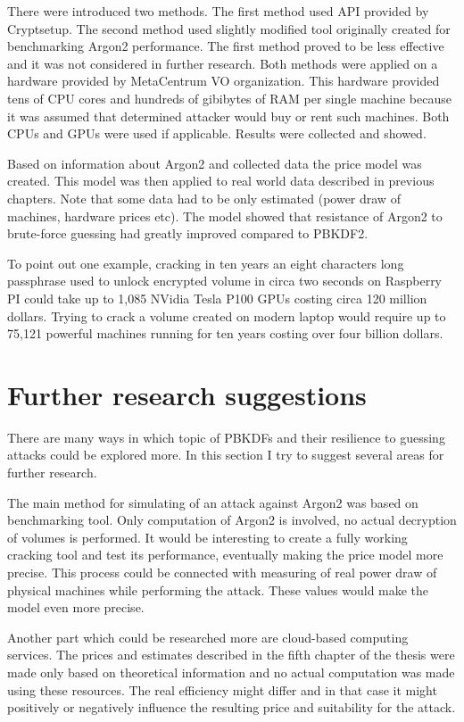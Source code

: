 \documentclass[nolof]{fithesis3}
\begin{document}
There were introduced two methods. The first method used API provided by Cryptsetup. The second method used slightly modified tool originally created for benchmarking Argon2 performance. The first method proved to be less effective and it was not considered in further research. Both methods were applied on a hardware provided by MetaCentrum VO organization. This hardware provided tens of CPU cores and hundreds of gibibytes of RAM per single machine because it was assumed that determined attacker would buy or rent such machines. Both CPUs and GPUs were used if applicable. Results were collected and showed.

Based on information about Argon2 and collected data the price model was created. This model was then applied to real world data described in previous chapters. Note that some data had to be only estimated (power draw of machines, hardware prices etc). The model showed that resistance of Argon2 to brute-force guessing had greatly improved compared to PBKDF2.

To point out one example, cracking in ten years an eight characters long passphrase used to unlock encrypted volume in circa two seconds on Raspberry PI could take up to 1,085 NVidia Tesla P100 GPUs costing circa 120 million dollars. Trying to crack a volume created on modern laptop would require up to 75,121 powerful machines running for ten years costing over four billion dollars.

\section{Further research suggestions}
There are many ways in which topic of PBKDFs and their resilience to guessing attacks could be explored more. In this section I try to suggest several areas for further research.

The main method for simulating of an attack against Argon2 was based on benchmarking tool. Only computation of Argon2 is involved, no actual decryption of volumes is performed. It would be interesting to create a fully working cracking tool and test its performance, eventually making the price model more precise. This process could be connected with measuring of real power draw of physical machines while performing the attack. These values would make the model even more precise.

Another part which could be researched more are cloud-based computing services. The prices and estimates described in the fifth chapter of the thesis were made only based on theoretical information and no actual computation was made using these resources. The real efficiency might differ and in that case it might positively or negatively influence the resulting price and suitability for the attack.
\end{document}

